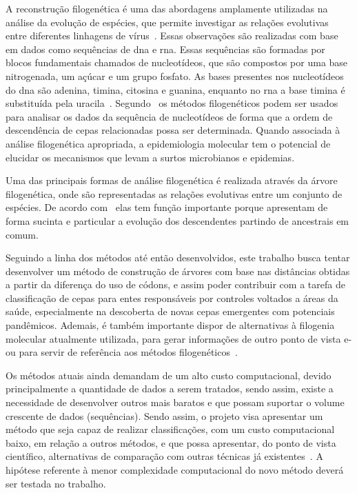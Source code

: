 A reconstrução filogenética é uma das abordagens amplamente utilizadas na análise da evolução de espécies, que permite investigar as relações evolutivas entre diferentes linhagens de vírus~\cite{sistematica_santos_2012, consideracoes_ribas_2006,dinossauros_santos_2008}. Essas observações são realizadas com base em dados como sequências de \gls{dna} e \gls{rna}. Essas sequências são formadas por blocos fundamentais chamados de nucleotídeos, que são compostos por uma base nitrogenada, um açúcar e um grupo fosfato. As bases presentes nos nucleotídeos do \gls{dna} são \gls{adenina}, \gls{timina}, \gls{citosina} e \gls{guanina}, enquanto no \gls{rna} a base \gls{timina} é substituída pela \gls{uracila}~\cite{alberts_molecular_2002,molecular_bernard_2022,genetica_peter_2017}.
Segundo~ os métodos filogenéticos podem ser usados para analisar os dados da sequência de nucleotídeos de forma que a ordem de descendência de cepas relacionadas possa ser determinada. Quando associada à análise filogenética apropriada, a epidemiologia molecular tem o potencial de elucidar os mecanismos que levam a surtos microbianos e epidemias.

Uma das principais formas de análise filogenética é realizada através da árvore filogenética, onde são representadas as relações evolutivas entre um conjunto de espécies. De acordo com~ elas tem função importante porque apresentam de forma sucinta e particular a evolução dos descendentes partindo de ancestrais em comum.

Seguindo a linha dos métodos até então desenvolvidos, este trabalho busca tentar desenvolver um método de construção de árvores com base nas distâncias obtidas a partir da diferença do uso de códons, e assim poder contribuir com a tarefa de classificação de cepas para entes responsáveis por controles voltados a áreas da saúde, especialmente na descoberta de novas cepas emergentes com potenciais pandêmicos. Ademais, é também importante dispor de alternativas à filogenia molecular atualmente utilizada, para gerar informações de outro ponto de vista e-ou para servir de referência aos métodos filogenéticos~\cite{virology_flint_2015}.

Os métodos atuais ainda demandam de um alto custo computacional, devido principalmente a quantidade de dados a serem tratados, sendo assim, existe a necessidade de desenvolver outros mais baratos e que possam suportar o volume crescente de dados (sequências).
Sendo assim, o projeto visa apresentar um método que seja capaz de realizar classificações, com um custo computacional baixo, em relação a outros métodos, e que possa apresentar, do ponto de vista científico, alternativas de comparação com outras técnicas já existentes~\cite{frank_chemistry_2017,gene_brow_2020}. A hipótese referente à menor complexidade computacional do novo método deverá ser testada no trabalho.

